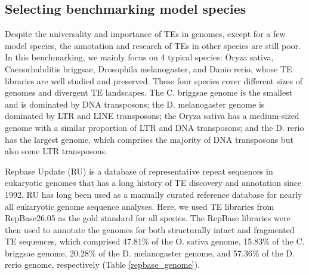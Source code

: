 \documentclass{bmcart}
\begin{document}
\subsection*{Selecting benchmarking model species}
Despite the universality and importance of TEs in genomes, except for a few model species, the annotation and research of TEs in other species are still poor. In this benchmarking, we mainly focus on 4 typical species: Oryza sativa, Caenorhabditis briggsae, Drosophila melanogaster, and Danio rerio, whose TE libraries are well studied and preserved. These four species cover different sizes of genomes and divergent TE landscapes. The C. briggsae genome is the smallest and is dominated by DNA transposons; the D. melanogaster genome is dominated by LTR and LINE transposons; the Oryza sativa has a medium-sized genome with a similar proportion of LTR and DNA transposons; and the D. rerio has the largest genome, which comprises the majority of DNA transposons but also some LTR transposons.

Repbase Update (RU) is a database of representative repeat sequences in eukaryotic genomes that has a long history of TE discovery and annotation since 1992\cite{bao2015repbase}. RU has long been used as a manually curated reference database for nearly all eukaryotic genome sequence analyses. Here, we used TE libraries from RepBase26.05 as the gold standard for all species. The RepBase libraries were then used to annotate the genomes for both structurally intact and fragmented TE sequences, which comprised 47.81\% of the O. sativa genome, 15.83\% of the C. briggsae genome, 20.28\% of the D. melanogaster genome, and 57.36\% of the D. rerio genome, respectively (Table \ref{repbase_genome}). 
\end{document}
